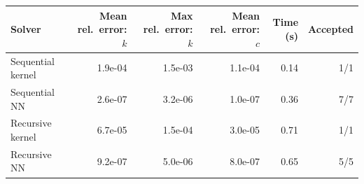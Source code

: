 \begin{tabular}{lrrrrr}
\toprule
Solver & Mean rel.\ error: $k$ & Max rel.\ error: $k$ & Mean rel.\ error: $c$ & Time (s) & Accepted \\
\midrule
Sequential kernel & 1.9e-04 & 1.5e-03 & 1.1e-04 & 0.14 & 1/1 \\
Sequential NN & 2.6e-07 & 3.2e-06 & 1.0e-07 & 0.36 & 7/7 \\
Recursive kernel & 6.7e-05 & 1.5e-04 & 3.0e-05 & 0.71 & 1/1 \\
Recursive NN & 9.2e-07 & 5.0e-06 & 8.0e-07 & 0.65 & 5/5 \\
\bottomrule
\end{tabular}
